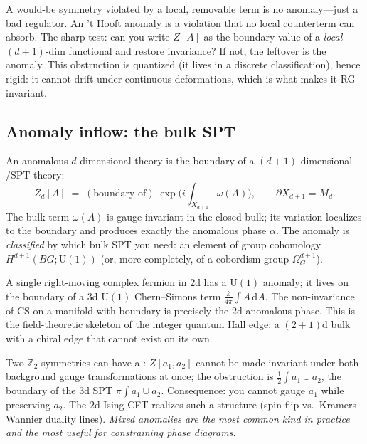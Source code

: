 \documentclass[11pt]{article}
\newcommand{\dd}{\mathrm{d}}                 %
\newcommand{\Uone}{\mathrm{U}(1)}
\newcommand{\Ztwo}{\mathbb{Z}_2}
\begin{document}
\begin{iintuition}[Anomaly = an obstruction you cannot localize away]
A would-be symmetry violated by a local, removable term is no anomaly---just a bad
regulator. An 't Hooft anomaly is a violation that no local counterterm can absorb. The
sharp test: can you write $Z[A]$ as the boundary value of a \emph{local} $(d{+}1)$-dim
functional and restore invariance? If not, the leftover is the anomaly. This obstruction
is quantized (it lives in a discrete classification), hence rigid: it cannot drift under
continuous deformations, which is what makes it RG-invariant.
\end{iintuition}

\subsection{Anomaly inflow: the bulk SPT}

\begin{eequation}
An anomalous $d$-dimensional theory is the boundary of a $(d{+}1)$-dimensional
/SPT theory:
\[
Z_{d}[A] \;=\; (\text{boundary of})\;\exp\!\Big(i\!\int_{X_{d+1}}\!\omega(A)\Big),
\qquad \partial X_{d+1}=M_d.
\]
The bulk term $\omega(A)$ is gauge invariant in the closed bulk; its variation localizes
to the boundary and produces exactly the anomalous phase $\alpha$. The anomaly is
\emph{classified} by which bulk SPT you need: an element of group cohomology
$H^{d+1}(BG;\Uone)$ (or, more completely, of a cobordism group $\Omega^{d+1}_G$).
\end{eequation}

\begin{eexample}
A single right-moving complex fermion in $2$d has a $\Uone$ anomaly; it lives on the
boundary of a $3$d $\Uone$ Chern--Simons term $\frac{k}{4\pi}\int A\,\dd A$. The
non-invariance of $\mathrm{CS}$ on a manifold with boundary is precisely the $2$d
anomalous phase. This is the field-theoretic skeleton of the integer quantum Hall edge:
a $(2{+}1)$d bulk with a chiral edge that cannot exist on its own.
\end{eexample}

\begin{eexample}[Mixed anomaly: a $\Ztwo\times\Ztwo$ in $2$d]
Two $\Ztwo$ symmetries can have a : $Z[a_1,a_2]$ cannot be made
invariant under both background gauge transformations at once; the obstruction is
$\frac{1}{2}\int a_1\cup a_2$, the boundary of the $3$d SPT $\pi\int a_1\cup a_2$.
Consequence: you cannot gauge $a_1$ while preserving $a_2$. The $2$d Ising CFT realizes
such a structure (spin-flip vs.\ Kramers--Wannier duality lines). \emph{Mixed anomalies
are the most common kind in practice and the most useful for constraining phase
diagrams.}
\end{eexample}
\end{document}
